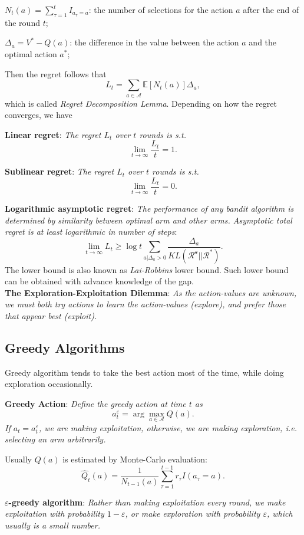 \documentclass{progartcn}
\begin{document}
		$N_t(a)=\sum_{\tau=1}^t I_{a_\tau=a}$: the number of selections for the action $a$ after the end of the round $t$;

		$\Delta_a=V^\ast-Q(a)$: the difference in the value between the action $a$ and the optimal action $a^\ast$;

		Then the regret follows that
		\[
		L_t=\sum_{a\in \mathcal{A}}\mathbb{E}[N_t(a)]\Delta_a,
		\label{rl_regret_count}
		\]
		which is called \textit{Regret Decomposition Lemma}. Depending on how the regret converges, we have

		\textbf{Linear regret}: \textit{The regret $L_t$ over $t$ rounds is s.t.}
		\[\lim_{t\to\infty} \frac{L_t}{t}=1.\]

		\textbf{Sublinear regret}: \textit{The regret $L_t$ over $t$ rounds is s.t.}
		\[\lim_{t\to\infty} \frac{L_t}{t}=0.\]

		\textbf{Logarithmic asymptotic regret}: \textit{The performance of any bandit algorithm is determined by similarity between optimal arm and other arms. Asymptotic total regret is at least logarithmic in number of steps}:
		\[\lim_{t\to\infty}L_t\ge \log t\sum_{a|\Delta_a>0}\frac{\Delta_a}{KL(\mathcal{R^a}||\mathcal{R^\ast})}.\]
		The lower bound is also known as \textit{Lai-Robbins} lower bound. Such lower bound can be obtained with advance knowledge of the gap.\\

		\textbf{The Exploration-Exploitation Dilemma}: \textit{As the action-values are unknown, we must both try actions to learn the action-values (explore), and prefer those that appear best (exploit).}\\

	\subsection{Greedy Algorithms}

		Greedy algorithm tends to take the best action most of the time, while doing exploration occasionally.

		\textbf{Greedy Action}: \textit{Define the greedy action at time $t$ as
		\[a^\varepsilon_t=\arg\max_{a\in \mathcal{A}} Q(a).\]
		If $a_t=a_t^\varepsilon$, we are making exploitation, otherwise, we are making exploration, i.e. selecting an arm arbitrarily.}

	 	Usually $Q(a)$ is estimated by Monte-Carlo evaluation:
	 	\[\hat{Q}_t(a)=\frac{1}{N_{t-1}(a)}\sum_{\tau=1}^{t-1}r_\tau I(a_\tau=a).\]

	 	\textbf{$\varepsilon$-greedy algorithm}: \textit{Rather than making exploitation every round, we make exploitation with probability $1-\varepsilon$, or make exploration with probability $\varepsilon$, which usually is a small number.}\\
\end{document}
